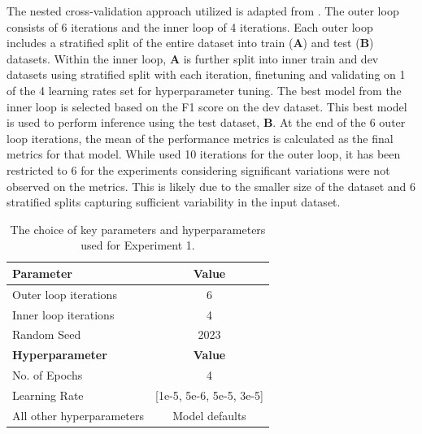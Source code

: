 The nested cross-validation approach utilized is adapted from \cite{preotiuc-pietro_automatically_2019}. The outer loop consists of 6 iterations and the inner loop of 4 iterations. Each outer loop includes a stratified split of the entire dataset into train (\textbf{A}) and test (\textbf{B}) datasets. Within the inner loop, \textbf{A} is further split into inner train and dev datasets using stratified split with each iteration, finetuning and validating on 1 of the 4 learning rates set for hyperparameter tuning. The best model from the inner loop is selected based on the F1 score on the dev dataset. This best model is used to perform inference using the test dataset, \textbf{B}. At the end of the 6 outer loop iterations, the mean of the performance metrics is calculated as the final metrics for that model. While \cite{preotiuc-pietro_automatically_2019} used 10 iterations for the outer loop, it has been restricted to 6 for the experiments considering significant variations were not observed on the metrics. This is likely due to the smaller size of the dataset and 6 stratified splits capturing sufficient variability in the input dataset.\\
\begin{table}[ht]
    \captionsetup{font=small}
    \small
    \centering
    \begin{tabularx}{\textwidth}{|X|c|}
        \hline
        \rowcolor[gray]{0.7}
        \textbf{Parameter}        & \textbf{Value}           \\
        \hline
        Outer loop iterations     & 6                        \\
        \rowcolor[gray]{0.9}
        Inner loop iterations     & 4                        \\
        Random Seed               & 2023                     \\
        \hline
        \hline
        \rowcolor[gray]{0.7}
        \textbf{Hyperparameter}   & \textbf{Value}           \\
        \hline
        No. of Epochs             & 4                        \\
        \rowcolor[gray]{0.9}
        Learning Rate             & [1e-5, 5e-6, 5e-5, 3e-5] \\
        All other hyperparameters & Model defaults           \\
        \hline
    \end{tabularx}
    \caption{The choice of key parameters and hyperparameters used for Experiment 1.}
    \label{tab: exp1_params}
\end{table}

